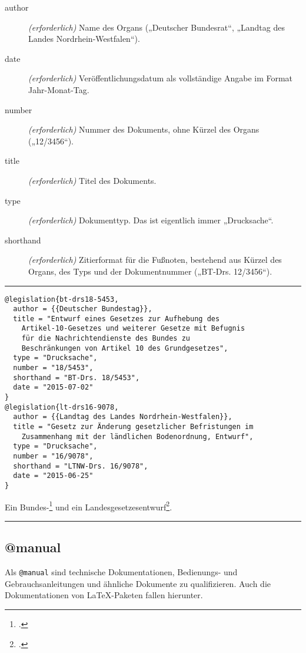 \documentclass[11pt,a4paper,DIV=calc,draft]{scrartcl}
\newenvironment{rubexample}{\par\vspace{\baselineskip}\hrule\par\begin{refsection}}{\end{refsection}\par\hrule\par\vspace{\baselineskip}}
\begin{document}
\begin{description}
\item[author] \emph{(erforderlich)} Name des Organs („Deutscher
  Bundesrat“, „Landtag des Landes Nordrhein-Westfalen“).
\item[date] \emph{(erforderlich)} Veröffentlichungsdatum als
  vollständige Angabe im Format Jahr-Monat-Tag.
\item[number] \emph{(erforderlich)} Nummer des Dokuments, ohne Kürzel
  des Organs („12/3456“).
\item[title] \emph{(erforderlich)} Titel des Dokuments.
\item[type] \emph{(erforderlich)} Dokumenttyp. Das ist eigentlich
  immer „Drucksache“.
\item[shorthand] \emph{(erforderlich)} Zitierformat für die Fußnoten,
  bestehend aus Kürzel des Organs, des Typs und der Dokumentnummer
  („BT-Drs. 12/3456“).
\end{description}

\begin{rubexample}
\begin{verbatim}
@legislation{bt-drs18-5453,
  author = {{Deutscher Bundestag}},
  title = "Entwurf eines Gesetzes zur Aufhebung des
    Artikel-10-Gesetzes und weiterer Gesetze mit Befugnis
    für die Nachrichtendienste des Bundes zu
    Beschränkungen von Artikel 10 des Grundgesetzes",
  type = "Drucksache",
  number = "18/5453",
  shorthand = "BT-Drs. 18/5453",
  date = "2015-07-02"
}
@legislation{lt-drs16-9078,
  author = {{Landtag des Landes Nordrhein-Westfalen}},
  title = "Gesetz zur Änderung gesetzlicher Befristungen im
    Zusammenhang mit der ländlichen Bodenordnung, Entwurf",
  type = "Drucksache",
  number = "16/9078",
  shorthand = "LTNW-Drs. 16/9078",
  date = "2015-06-25"
}
\end{verbatim}

Ein Bundes-\footcite{bt-drs18-5453} und ein
Landesgesetzesentwurf\footcite[9]{lt-drs16-9078}.

\printbibliography
\end{rubexample}

\subsection{@manual}

Als \verb+@manual+ sind technische Dokumentationen,
Bedienungs- und Gebrauchsanleitungen und ähnliche Dokumente zu
qualifizieren. Auch die Dokumentationen von \LaTeX{}-Pa\-ke\-ten
fallen hierunter.
\end{document}
